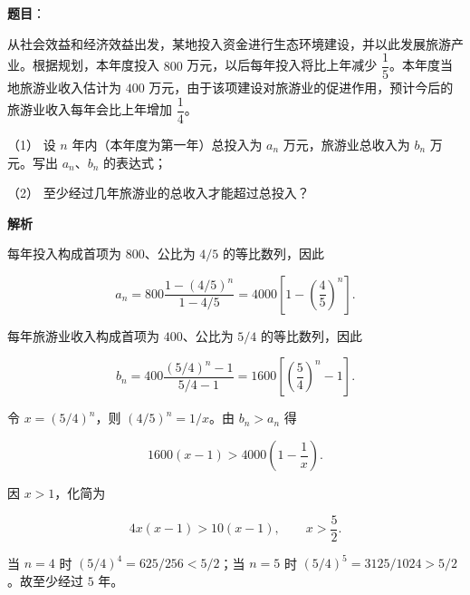 \begin{answer}

\textbf{题目}：

从社会效益和经济效益出发，某地投入资金进行生态环境建设，并以此发展旅游产业。根据规划，本年度投入 $800$ 万元，以后每年投入将比上年减少 $\dfrac15$。本年度当地旅游业收入估计为 $400$ 万元，由于该项建设对旅游业的促进作用，预计今后的旅游业收入每年会比上年增加 $\dfrac14$。

（1） 设 $n$ 年内（本年度为第一年）总投入为 $a_n$ 万元，旅游业总收入为 $b_n$ 万元。写出 $a_n$、$b_n$ 的表达式；

（2） 至少经过几年旅游业的总收入才能超过总投入？

\textbf{解析}


每年投入构成首项为 $800$、公比为 $4/5$ 的等比数列，因此

\nopagebreak[4]
\[
a_n=800\frac{1-(4/5)^n}{1-4/5}
=4000\left[1-\left(\frac45\right)^n\right].
\]

每年旅游业收入构成首项为 $400$、公比为 $5/4$ 的等比数列，因此

\nopagebreak[4]
\[
b_n=400\frac{(5/4)^n-1}{5/4-1}
=1600\left[\left(\frac54\right)^n-1\right].
\]


令 $x=(5/4)^n$，则 $(4/5)^n=1/x$。由 $b_n>a_n$ 得

\nopagebreak[4]
\[
1600(x-1)>4000\left(1-\frac1x\right).
\]

因 $x>1$，化简为

\nopagebreak[4]
\[
4x(x-1)>10(x-1),\qquad x>\frac52.
\]

当 $n=4$ 时 $(5/4)^4=625/256<5/2$；当 $n=5$ 时 $(5/4)^5=3125/1024>5/2$。故至少经过 $5$ 年。



\end{answer}
